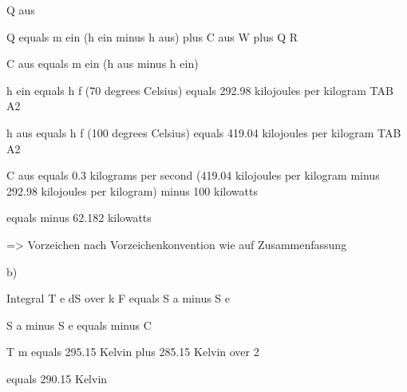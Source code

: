 Q aus

Q equals m ein (h ein minus h aus) plus C aus W plus Q R

C aus equals m ein (h aus minus h ein)

h ein equals h f (70 degrees Celsius) equals 292.98 kilojoules per kilogram TAB A2

h aus equals h f (100 degrees Celsius) equals 419.04 kilojoules per kilogram TAB A2

C aus equals 0.3 kilograms per second (419.04 kilojoules per kilogram minus 292.98 kilojoules per kilogram) minus 100 kilowatts

equals minus 62.182 kilowatts

=> Vorzeichen nach Vorzeichenkonvention wie auf Zusammenfassung

b)

Integral T e dS over k F equals S a minus S e

S a minus S e equals minus C

T m equals 295.15 Kelvin plus 285.15 Kelvin over 2

equals 290.15 Kelvin